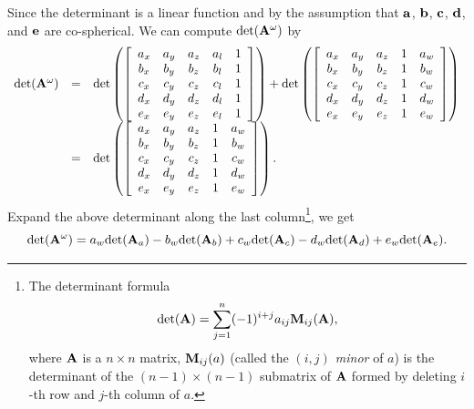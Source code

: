 Since the determinant is a linear function and by the assumption that ${\bf a}$, ${\bf b}$, ${\bf c}$, ${\bf d}$, and ${\bf e}$ are co-spherical. We can compute $\textrm{det}({\bf A}^{\omega})$ by
\[
  \begin{array}{rcl}
  \textrm{det}({\bf A}^{\omega}) &=& \textrm{det}\left(
      \left[\begin{array}{ccccc}
      a_x & a_y & a_z & a_l & 1\\
      b_x & b_y & b_z & b_l & 1\\
      c_x & c_y & c_z & c_l & 1\\
      d_x & d_y & d_z & d_l & 1\\
      e_x & e_y & e_z & e_l & 1 
      \end{array}\right]\right)
    + \textrm{det}\left(
      \left[\begin{array}{ccccc}
      a_x & a_y & a_z & 1 & a_w\\
      b_x & b_y & b_z & 1 & b_w\\
      c_x & c_y & c_z & 1 & c_w\\
      d_x & d_y & d_z & 1 & d_w\\
      e_x & e_y & e_z & 1 & e_w
      \end{array}\right]\right)\\
    &=& \textrm{det}\left(
      \left[\begin{array}{ccccc}
      a_x & a_y & a_z & 1 & a_w\\
      b_x & b_y & b_z & 1 & b_w\\
      c_x & c_y & c_z & 1 & c_w\\
      d_x & d_y & d_z & 1 & d_w\\
      e_x & e_y & e_z & 1 & e_w
      \end{array}\right]\right).\\
  \end{array}
\]
Expand the above determinant along the last column\footnote{The determinant formula
\[
  \textrm{det}({\bf A}) = \sum_{j=1}^{n} (-1)^{i+j} a_{ij} {\bf M}_{ij}({\bf A}),
\]
where ${\bf A}$ is a $n \times n$ matrix, ${\bf M}_{ij}(a)$ (called the {\it $(i,j)$ minor} of $a$) is the determinant of the $(n-1) \times (n-1)$ submatrix of ${\bf A}$ formed by deleting $i$-th row and $j$-th column of $a$.}, we get
\begin{equation}\label{equ:perturb}
  \textrm{det}({\bf A}^{\omega}) = a_w \textrm{det}({\bf A}_a) - b_w \textrm{det}({\bf A}_b) + c_w \textrm{det}({\bf A}_c) - d_w \textrm{det}({\bf A}_d) + e_w \textrm{det}({\bf A}_e).
\end{equation}
